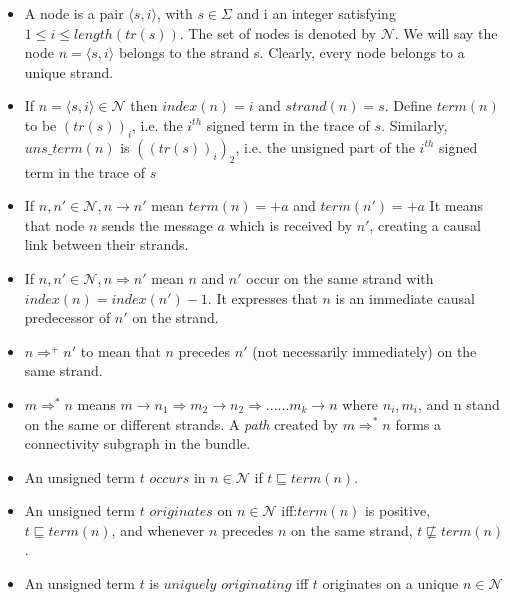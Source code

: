 	\begin{itemize}
		\item A node is a pair $\langle s,i\rangle$, with $s \in \Sigma$ and i an integer satisfying $1\leq i \leq length(tr(s))$. The set of nodes is denoted by $\mathcal{N}$. We will say the node $n= \langle s,i\rangle$ belongs to the strand s. Clearly, every node belongs to a unique strand. 

		\item If $n= \langle s,i \rangle \in \mathcal{N}$ then $index(n) = i$ and $strand(n)=s$. Define $term(n)$ to be $(tr(s))_i$, i.e. the $i^{th}$ signed term in the trace of $s$. Similarly, $uns\_term(n)$ is $((tr(s))_i)_2$, i.e. the unsigned part of the $i^{th}$ signed term in the trace of $s$

		\item If $n,n' \in \mathcal{N}, n \rightarrow n'$ mean $term(n) = +a$ and $term(n') = +a$ It means that node $n$ sends the message $a$ which is received by $n'$, creating a causal link between their strands.

		\item If $n,n' \in \mathcal{N}, n \Rightarrow n'$ mean $n$ and $n'$ occur on the same strand with $index(n)=index(n') -1 $. It expresses that $n$ is an immediate causal predecessor of $n'$ on the strand. 
		
		\item $n \Rightarrow^+ n'$ to mean that $n$ precedes $n'$ (not necessarily immediately) on the same strand.
			
		\item $m \Rightarrow^* n$ means $m \rightarrow n_1 \Rightarrow m_2 \rightarrow n_2 \Rightarrow ......m_k \rightarrow n$ where $n_i, m_i$, and n stand on the same or different strands. A \emph{path} created by $m \Rightarrow^* n$ forms a connectivity subgraph in the bundle. 

		\item An unsigned term $t$ $occurs$ in $n \in \mathcal{N}$ if $t \sqsubseteq term(n)$.

		\item An unsigned term $t$ $originates$ on $n \in \mathcal{N}$ iff:$term(n)$ is positive, $t \sqsubseteq term(n)$, and whenever $n$ precedes $n$ on the same strand, $t \not\sqsubseteq term(n)$.

		\item An unsigned term $t$ is $\textit{uniquely originating}$ iff $t$ originates on a unique $n \in \mathcal{N}$ 

	\end{itemize}
	
